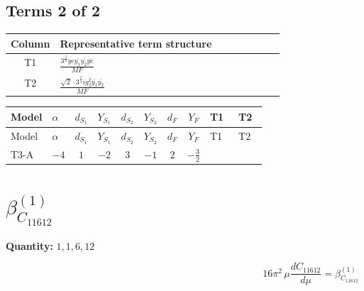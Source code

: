 \documentclass[8pt]{article}
\begin{document}
\begin{landscape}
\subsection*{Terms 2 of 2}
\begin{center}
\begin{tabular}{@{}c >{\raggedright\arraybackslash}p{0.82\linewidth}@{}}
\toprule
Column & Representative term structure \\
\midrule
T1 & \(\displaystyle \frac{3^{\frac{3}{4}} ye \overline{y_{1}} \overline{y_{2}} \overline{ye}}{MF}\) \\
\midrule
T2 & \(\displaystyle \frac{\sqrt{2} \cdot 3^{\frac{3}{4}} i g_{2}^{2} \overline{y_{1}} \overline{y_{2}}}{MF}\) \\
\midrule
\bottomrule
\end{tabular}
\end{center}
\smallskip
\tiny
\begin{longtable}{@{}llcccccc >{\raggedright\arraybackslash}p{0.21\linewidth} >{\raggedright\arraybackslash}p{0.21\linewidth}@{}}
\toprule
Model & $\alpha$ & $d_{S_1}$ & $Y_{S_1}$ & $d_{S_2}$ & $Y_{S_2}$ & $d_F$ & $Y_F$ & T1 & T2 \\
\midrule
\endfirsthead
\toprule
Model & $\alpha$ & $d_{S_1}$ & $Y_{S_1}$ & $d_{S_2}$ & $Y_{S_2}$ & $d_F$ & $Y_F$ & T1 & T2 \\
\midrule
\endhead
T3-A & $-4$ & $1$ & $-2$ & $3$ & $-1$ & $2$ & $-\frac{3}{2}$ & \scriptsize\adjustbox{max width=\linewidth}{$\begin{gathered} \frac{3^{\frac{3}{4}} ye \overline{y_{1}} \overline{y_{2}} \overline{ye}}{12 MF}\end{gathered}$} & \scriptsize\adjustbox{max width=\linewidth}{$\begin{gathered} - \frac{\sqrt{2} \cdot 3^{\frac{3}{4}} i g_{2}^{2} \overline{y_{1}} \overline{y_{2}}}{3 MF}\end{gathered}$} \\
\midrule
\bottomrule
\end{longtable}
\clearpage
\section*{$\beta_{C_{11612}}^{(1)}$}
\noindent\textbf{Quantity: }$\mathrm{1,1,6,12}$\par\smallskip
\[16\pi^2\,\mu\frac{d C_{11612}}{d\mu}=\beta_{C_{11612}}^{(1)}\]

\end{landscape}
\end{document}
